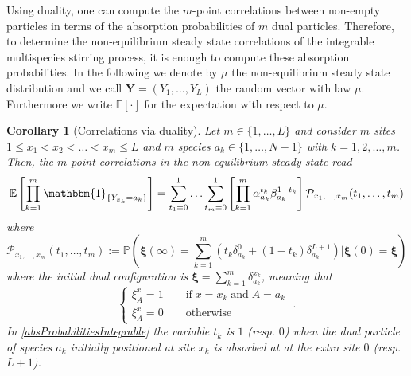 \documentclass[10pt]{article}
\numberwithin{equation}{section}
\numberwithin{equation}{subsection}
\newtheorem{corollary}{Corollary}
\newcommand{\dt}{\;.}
\begin{document}
Using duality, one can compute the  $m$-point correlations between non-empty particles in terms of the absorption probabilities of $m$ dual particles. Therefore, to determine the non-equilibrium steady state correlations of the integrable multispecies stirring process, it is enough to compute these absorption probabilities. In the following we denote by $\mu$ the non-equilibrium steady state distribution and we call $\bm{Y} = (Y_1,\ldots,Y_L)$ the random vector with law $\mu$. 
Furthermore we write $\mathbb{E}[\cdot]$ for the expectation with respect to $\mu$.%
\begin{corollary}[Correlations via duality]\label{Corolollary-ABS_Corr-abstract}
Let $m\in \{1,\ldots,L\}$ and consider $m$ sites $1 \le x_{1} < x_2 < \ldots < x_m \le L $ and
$m$ species $a_{k}\in\{1,\ldots,N-1\}$  with $k=1,2,\ldots, m$. Then, the $m$-point correlations in the non-equilibrium steady state read
\begin{equation}\label{NESS-expectation-ABS}
\mathbb{E}\left[\prod_{k=1}^{m}\mathbbm{1}_{\{Y_{x_{k}}=a_{k}\}}\right]=\sum_{t_{1}=0}^{1}\ldots \sum_{t_{m}=0}^{1}\left[\prod_{k=1}^{m}\alpha_{a_{k}}^{t_{k}}\beta_{a_{k}}^{1-t_{k}}\right]\mathcal{P}_{x_1,\ldots,x_m}(t_{1},\ldots,t_{m})
\end{equation}
where
\begin{equation}\label{absProbabilitiesIntegrable}
	\mathcal{P}_{x_1,\ldots,x_m}(t_{1},\ldots,t_{m}):=\mathbb{P}\left(\bm{\xi}(\infty)=\sum_{k=1}^{m}\left(t_{k}\delta^{0}_{a_k}+(1-t_{k})\delta^{L+1}_{a_k}\right)\Big| \bm{\xi}(0)=\bm{\xi}\right)
\end{equation}
where the initial dual configuration is $\bm{\xi}=\sum_{k=1}^{m}\delta_{a_{k}}^{x_{k}}$, meaning that 
\begin{equation}
\label{xsi-init}
	\begin{cases}
		\xi_{A}^{x}=1\qquad \text{if}\;x=x_{k}\;\text{and}\; A=a_{k}\\
		\xi_{A}^{x}=0\qquad \text{otherwise}
	\end{cases}\dt
\end{equation}
In \eqref{absProbabilitiesIntegrable} the variable $t_k$ is $1$ (resp. $0$) when the dual particle of species $a_k$ initially positioned at site $x_{k}$ is absorbed at at the extra site $0$ (resp. $L+1$).
\end{corollary}
\end{document}
